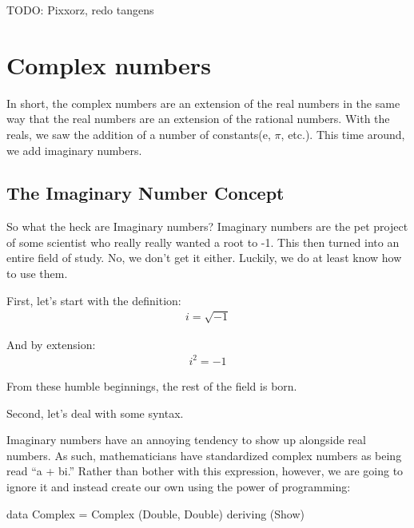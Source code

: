 TODO: Pixxorz, redo tangens

\section{Complex numbers}
\iffalse
Här är målet främst att introducera dsl som koncept och även introducera hur vi behandlar komplexa tal eftersom detta kommer återkomma mycket i texten. Vi gör detta genom att snabbt repetera komplexa tal. Vi antar dock att läsaren egentligen är bekväm med komplexa tal och att detta istället är en mjukstart för dsl, haskell och våra egna betäckningar.\\
\fi

In short, the complex numbers are an extension of the real numbers in the same way that the real numbers are an extension of the rational numbers. With the reals, we saw the addition of a number of constants(e, $\pi$, etc.).
This time around, we add imaginary numbers.


\subsection{The Imaginary Number Concept}
So what the heck are Imaginary numbers? Imaginary numbers are the pet project of some scientist who really really wanted a root to -1. This then turned into an entire field of study. No, we don't get it either. Luckily, we do at least know how to use them.

First, let's start with the definition:
\begin{align*}
    i = \sqrt{-1}
\end{align*}

And by extension:
\begin{align*}
    i^2 = -1
\end{align*}

From these humble beginnings, the rest of the field is born.
\vspace{5mm}

Second, let's deal with some syntax.

Imaginary numbers have an annoying tendency to show up alongside real numbers. As such, mathematicians have standardized complex numbers as being read ``a + bi.'' Rather than bother with this expression, however, we are going to ignore it and instead create our own using the power of programming:
\begin{code}
data Complex = Complex (Double, Double)
  deriving (Show)
\end{code}

